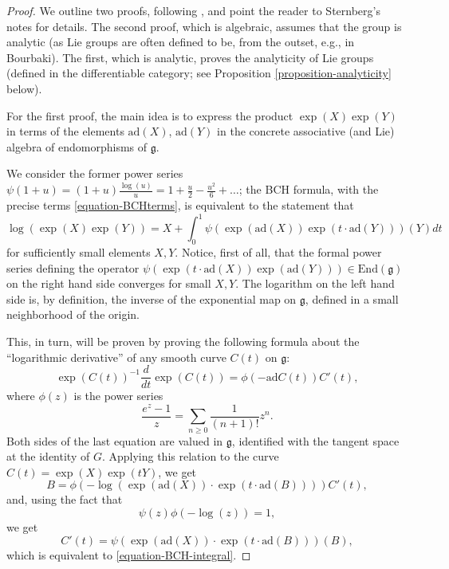 \begin{proof}
 We outline two proofs, following \cite{Sternberg}, and point the reader to Sternberg's notes for details. The second proof, which is algebraic, assumes that the group is analytic (as Lie groups are often defined to be, from the outset, e.g., in Bourbaki). The first, which is analytic, proves the analyticity of Lie groups (defined in the differentiable category; see Proposition \ref{proposition-analyticity} below).
 
 For the first proof, the main idea is to express the product $\exp(X)\exp(Y)$ in terms of the elements $\text{ad}(X)$, $\text{ad}(Y)$ in the concrete associative (and Lie) algebra of endomorphisms of $\mathfrak g$. 
 
 We consider the former power series $\psi(1+u) = (1+u) \frac{\log(u)}{u} = 1+\frac{u}{2} - \frac{u^2}{6}+ \dots$; the BCH formula, with the precise terms \eqref{equation-BCHterms}, is equivalent to the statement that 
\begin{equation}
 \label{equation-BCH-integral}
 \log(\exp(X)\exp(Y)) = X + \int_0^1 \psi(\exp(\text{ad}(X)) \exp(t\cdot \text{ad}(Y))) (Y) dt
\end{equation}
for sufficiently small elements $X, Y$. Notice, first of all, that the formal power series defining the operator $\psi(\exp(t\cdot \text{ad}(X)) \exp(\text{ad}(Y))) \in \text{End}(\mathfrak g)$ on the right hand side converges for small $X, Y$. The logarithm on the left hand side is, by definition, the inverse of the exponential map on $\mathfrak g$, defined in a small neighborhood of the origin. 

This, in turn, will be proven by proving the following formula about the ``logarithmic derivative'' of any smooth curve $C(t)$ on $\mathfrak g$:
\begin{equation}
\label{equation-BCH-logderivative}
 \exp(C(t))^{-1} \frac{d}{dt} \exp(C(t)) = \phi(-\text{ad} C(t)) C'(t),
\end{equation}
where $\phi(z)$ is the power series 
$$\frac{e^z-1}{z} = \sum_{n\ge 0} \frac{1}{(n+1)!} z^n.$$ 
Both sides of the last equation are valued in $\mathfrak g$, identified with the tangent space at the identity of $G$. Applying this relation to the curve $C(t) = \exp(X) \exp(tY)$, we get 
$$ B = \phi(- \log(\exp(\text{ad} (X)) \cdot \exp(t\cdot \text{ad}(B)))) C'(t),$$
and, using the fact that 
$$ \psi(z) \phi(-\log(z)) = 1,$$
we get 
$$ C'(t) = \psi(\exp(\text{ad} (X)) \cdot \exp(t\cdot \text{ad}(B))) (B), $$
which is equivalent to \eqref{equation-BCH-integral}. 


\end{proof}
